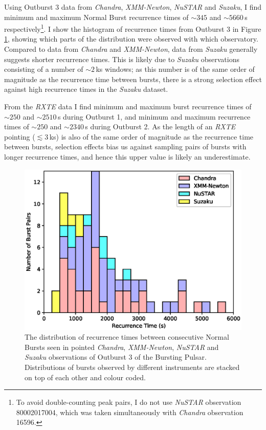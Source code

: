 \par Using Outburst 3 data from \textit{Chandra}, \textit{XMM-Newton}, \textit{NuSTAR} and \textit{Suzaku}, I find minimum and maximum Normal Burst recurrence times of $\sim345$ and $\sim5660$\,s respectively\footnote{To avoid double-counting peak pairs, I do not use \textit{NuSTAR} observation 80002017004, which was taken simultaneously with \textit{Chandra} observation 16596.}.  I show the histogram of recurrence times from Outburst 3 in Figure \ref{fig:sep}, showing which parts of the distribution were observed with which observatory.  Compared to data from \textit{Chandra} and \textit{XMM-Newton}, data from \textit{Suzaku} generally suggests shorter recurrence times.  This is likely due to \textit{Suzaku} observations consisting of a number of $\sim2$\,ks windows; as this number is of the same order of magnitude as the recurrence time between bursts, there is a strong selection effect against high recurrence times in the \textit{Suzaku} dataset.
\par From the \textit{RXTE} data I find minimum and maximum burst recurrence times of $\sim250$ and $\sim2510$\,s during Outburst 1, and minimum and maximum recurrence times of $\sim250$ and $\sim2340$\,s during Outburst 2.  As the length of an \textit{RXTE} pointing ($\lesssim3$\,ks) is also of the same order of magnitude as the recurrence time between bursts, selection effects bias us against sampling pairs of bursts with longer recurrence times, and hence this upper value is likely an underestimate.

\begin{figure}
  \centering
  \includegraphics[width=.9\linewidth, trim={0.4cm 0 1.1cm 0},clip]{images/manyinst_stdist.eps}
  \caption[The distribution of recurrence times between consecutive Normal Bursts in Outburst 3.]{\small The distribution of recurrence times between consecutive Normal Bursts seen in pointed \textit{Chandra}, \textit{XMM-Newton}, \textit{NuSTAR} and \textit{Suzaku} observations of Outburst 3 of the Bursting Pulsar.  Distributions of bursts observed by different instruments are stacked on top of each other and colour coded.}
  \label{fig:sep}
\end{figure}

